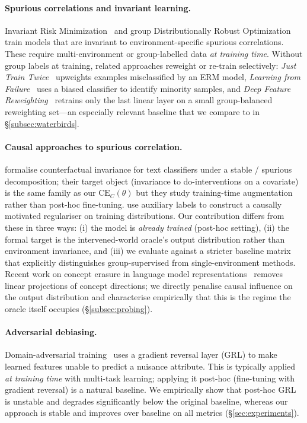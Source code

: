\documentclass{article}
\newcommand{\CE}{\mathrm{CE}}
\begin{document}
\paragraph{Spurious correlations and invariant learning.}
Invariant Risk Minimization~\cite{arjovsky2019irm} and group Distributionally
Robust Optimization~\cite{sagawa2020dro} train models that are invariant to
environment-specific spurious correlations.  These require multi-environment
or group-labelled data \emph{at training time}.  Without group labels at
training, related approaches reweight or re-train selectively: \emph{Just
Train Twice}~\cite{liu2021jtt} upweights examples misclassified by an ERM
model, \emph{Learning from Failure}~\cite{nam2020lff} uses a biased classifier
to identify minority samples, and \emph{Deep Feature
Reweighting}~\cite{kirichenko2023last} retrains only the last linear layer on
a small group-balanced reweighting set—an especially relevant baseline that
we compare to in \S\ref{subsec:waterbirds}.

\paragraph{Causal approaches to spurious correlation.}
\citet{veitch2021counterfactual} formalise counterfactual invariance for text
classifiers under a stable / spurious decomposition; their target object
(invariance to do-interventions on a covariate) is the same family as our
$\CE_C(\theta)$ but they study training-time augmentation rather than
post-hoc fine-tuning.  \citet{makar2022causally} use auxiliary labels to
construct a causally motivated regulariser on training distributions.
Our contribution differs from these in three ways: (i) the model is
\emph{already trained} (post-hoc setting), (ii) the formal target is the
intervened-world oracle's output distribution rather than environment
invariance, and (iii) we evaluate against a stricter baseline matrix that
explicitly distinguishes group-supervised from single-environment methods.
Recent work on concept erasure in language model
representations~\cite{belrose2023concept} removes linear projections of
concept directions; we directly penalise causal influence on the output
distribution and characterise empirically that this is the regime the oracle
itself occupies (\S\ref{subsec:probing}).

\paragraph{Adversarial debiasing.}
Domain-adversarial training~\cite{ganin2016domain} uses a gradient reversal
layer (GRL) to make learned features unable to predict a nuisance attribute.
This is typically applied \emph{at training time} with multi-task learning;
applying it post-hoc (fine-tuning with gradient reversal) is a natural baseline.
We empirically show that post-hoc GRL is unstable and degrades significantly
below the original baseline, whereas our approach is stable and improves
over baseline on all metrics (\S\ref{sec:experiments}).
\end{document}
